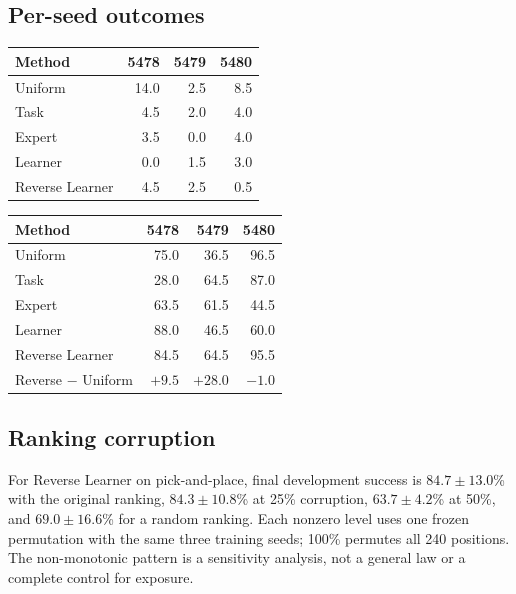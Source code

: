 \begin{samepage}
\subsection{Per-seed outcomes}
\begin{center}
\begin{minipage}{\linewidth}
\centering
\makeatletter
\def\@captype{table}
\makeatother
\caption{Stacking Fresh-ID success by training seed (\%).}
\label{tab:stack-seeds}
\small
\begin{tabular}{lrrr}
\toprule
Method & 5478 & 5479 & 5480 \\
\midrule
Uniform & 14.0 & 2.5 & 8.5 \\
Task & 4.5 & 2.0 & 4.0 \\
Expert & 3.5 & 0.0 & 4.0 \\
Learner & 0.0 & 1.5 & 3.0 \\
Reverse Learner & 4.5 & 2.5 & 0.5 \\
\bottomrule
\end{tabular}
\end{minipage}
\end{center}
\end{samepage}

\begin{samepage}
\begin{center}
\begin{minipage}{\linewidth}
\centering
\makeatletter
\def\@captype{table}
\makeatother
\caption{Pick-and-place Fresh-ID success by training seed (\%). The final row
is the seed-matched Reverse Learner minus Uniform difference in percentage
points.}
\label{tab:pnp-seeds}
\small
\begin{tabular}{lrrr}
\toprule
Method & 5478 & 5479 & 5480 \\
\midrule
Uniform & 75.0 & 36.5 & 96.5 \\
Task & 28.0 & 64.5 & 87.0 \\
Expert & 63.5 & 61.5 & 44.5 \\
Learner & 88.0 & 46.5 & 60.0 \\
Reverse Learner & 84.5 & 64.5 & 95.5 \\
Reverse $-$ Uniform & $+9.5$ & $+28.0$ & $-1.0$ \\
\bottomrule
\end{tabular}
\end{minipage}
\end{center}
\end{samepage}

\subsection{Ranking corruption}
For Reverse Learner on pick-and-place, final development success is
$84.7\!\pm\!13.0$\% with the original ranking, $84.3\!\pm\!10.8$\% at 25\%
corruption, $63.7\!\pm\!4.2$\% at 50\%, and $69.0\!\pm\!16.6$\% for a random
ranking. Each nonzero level uses one frozen permutation with the same three
training seeds; 100\% permutes all 240 positions. The non-monotonic pattern is
a sensitivity analysis, not a general law or a complete control for exposure.

